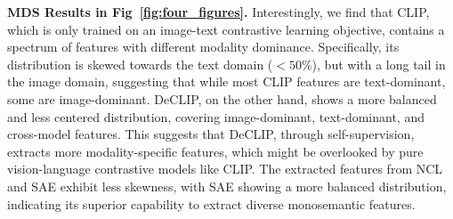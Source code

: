     

\textbf{MDS Results in Fig~\ref{fig:four_figures}.} Interestingly, we find that    
CLIP, which is only trained on an image-text contrastive learning objective, contains {a spectrum of features with different modality dominance}. 
Specifically, its distribution is skewed towards the text domain ($<50\%$), but with a long tail in the image domain, suggesting that while most CLIP features are  text-dominant, some are image-dominant.
DeCLIP, on the other hand, shows a more balanced and less centered distribution, %
covering image-dominant, text-dominant, and cross-model features. This suggests that DeCLIP,  through self-supervision, extracts more modality-specific features, which might be overlooked by pure vision-language contrastive models like CLIP. %
The extracted features from NCL and SAE exhibit less skewness, with SAE showing a more balanced distribution, indicating its superior capability to extract diverse monosemantic features.


